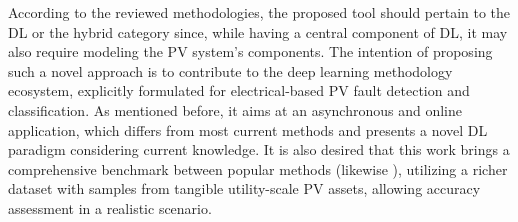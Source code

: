 According to the reviewed methodologies, the proposed tool should pertain to the DL or the hybrid category since, while having a central component of DL, it may also require modeling the PV system's components. The intention of proposing such a novel approach is to contribute to the deep learning methodology ecosystem, explicitly formulated for electrical-based PV fault detection and classification. As mentioned before, it aims at an asynchronous and online application, which differs from most current methods and presents a novel DL paradigm considering current knowledge. It is also desired that this work brings a comprehensive benchmark between popular methods (likewise \cite{Aziz2020}), utilizing a richer dataset with samples from tangible utility-scale PV assets, allowing accuracy assessment in a realistic scenario.


